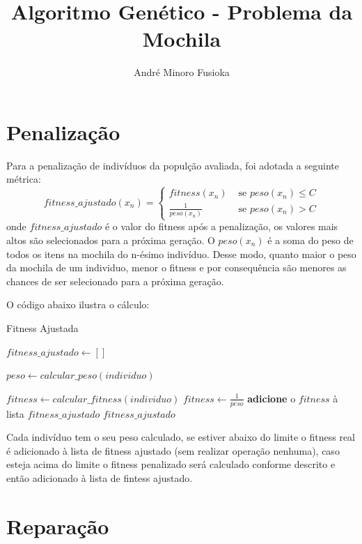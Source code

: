 \documentclass[11pt]{article}
\title{\textbf{Algoritmo Genético - Problema da Mochila}}
\author{André Minoro Fusioka}
\date{}
\begin{document}
\maketitle

\section{Penalização}

Para a penalização de indivíduos da populção avaliada, foi adotada a seguinte métrica: 
$$
fitness\_ajustado(x_n) =
\begin{cases}
 fitness(x_n) & \text{ se } peso(x_n) \leq  C \\ 
 \frac{1}{peso(x_n)} & \text{ se } peso(x_n) >  C 
\end{cases}
$$
onde $fitness\_ajustado$ é o valor do fitness após a penalização, os valores mais altos são selecionados para a próxima geração. O $peso(x_n)$ é a soma do peso de todos os itens na mochila do n-ésimo indivíduo. Desse modo, quanto maior o peso da mochila de um individuo, menor o fitness e por consequência são menores as chances de ser selecionado  para a próxima geração.

O código abaixo ilustra o cálculo:

\begin{algorithm}
	\caption{Fitness Ajustada}\label{euclid}
	\begin{algorithmic}[1]
		
			\State $fitness\_ajustado \gets []$
			
				 \State $peso \gets calcular\_peso(individuo)$
				
					\State $fitness \gets calcular\_fitness(individuo) $
				 \Else
					\State $fitness \gets \frac{1}{peso}$		 
				\EndIf
				\State \textbf{adicione} o $fitness$ à lista $fitness\_ajustado$
			\State \Return $fitness\_ajustado$
		\EndFunction
	\end{algorithmic}
\end{algorithm}

Cada indivíduo tem o seu peso calculado, se estiver abaixo do limite o fitness real é adicionado à lista de fitness ajustado (sem realizar operação nenhuma), caso esteja acima do limite o fitness penalizado será calculado conforme descrito e então adicionado à lista de fintess ajustado. 

\section{Reparação}
\end{document}
